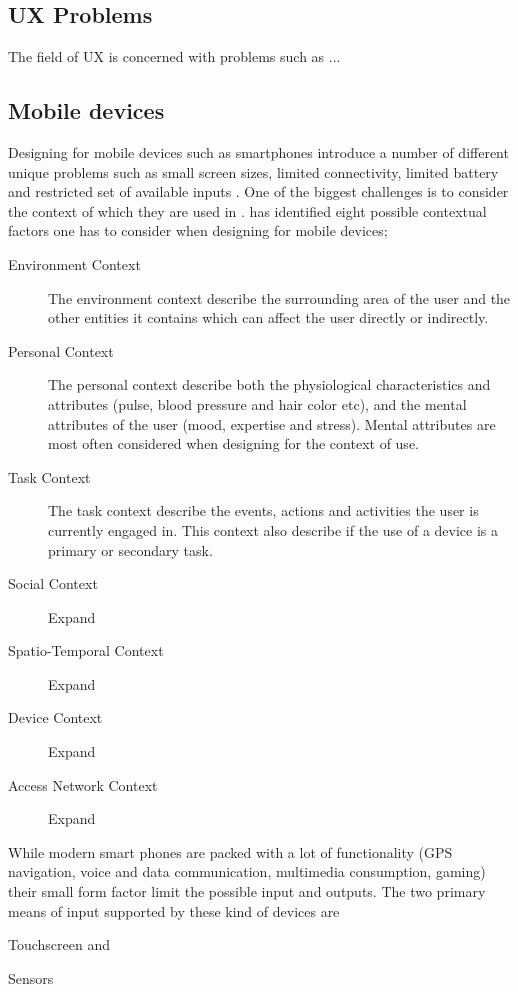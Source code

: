 \subsection{UX Problems}
The field of UX is concerned with problems such as ... 

\subsection{Mobile devices}
Designing for mobile devices such as smartphones introduce a number of different unique problems such as small screen sizes, limited connectivity, limited battery and restricted set of available inputs \cite{Zhang2005}. One of the biggest challenges is to consider the context of which they are used in \cite{Zhang2005} \cite{Harrison2013} \cite{Korhonen2010}. \cite{Korhonen2010} has identified eight possible contextual factors one has to consider when designing for mobile devices;
\begin{description}
  \item [Environment Context] The environment context describe the surrounding area of the user and the other entities it contains which can affect the user directly or indirectly.
  \item [Personal Context] The personal context describe both the physiological characteristics and attributes (pulse, blood pressure and hair color etc), and the mental attributes of the user (mood, expertise and stress). Mental attributes are most often considered when designing for the context of use.
  \item[Task Context] The task context describe the events, actions and activities the user is currently engaged in. This context also describe if the use of a device is a primary or secondary task.
  \item[Social Context] Expand
  \item[Spatio-Temporal Context] Expand
  \item[Device Context] Expand
  \item[Access Network Context] Expand
\end{description}
While modern smart phones are packed with a lot of functionality (GPS navigation, voice and data communication, multimedia consumption, gaming) their small form factor limit the possible input and outputs. The two primary means of input supported by these kind of devices are
\begin{enumerate*}
  \item Touchscreen and
  \item Sensors
\end{enumerate*}

